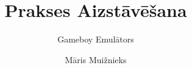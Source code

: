 \documentclass{beamer}
\title{Prakses Aizstāvēšana}
\subtitle{Gameboy Emulātors}
\author{Māris Muižnieks}
\begin{document}
\begin{frame}
	\maketitle
\end{frame}
\end{document}
